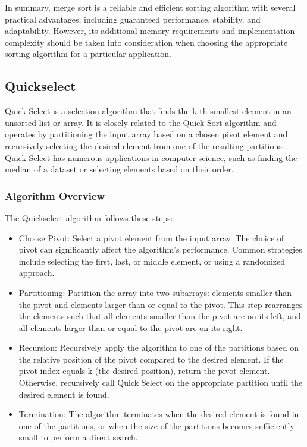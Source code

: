 \documentclass[12pt]{book} %
\begin{document}
In summary, merge sort is a reliable and efficient sorting algorithm with several practical advantages, including guaranteed performance, stability, and adaptability. However, its additional memory requirements and implementation complexity should be taken into consideration when choosing the appropriate sorting algorithm for a particular application.

\subsection{Quickselect}
Quick Select is a selection algorithm that finds the k-th smallest element in an unsorted list or array. It is closely related to the Quick Sort algorithm and operates by partitioning the input array based on a chosen pivot element and recursively selecting the desired element from one of the resulting partitions. Quick Select has numerous applications in computer science, such as finding the median of a dataset or selecting elements based on their order.
\subsubsection{Algorithm Overview}

The Quickselect algorithm follows these steps:
\begin{itemize}
    \item Choose Pivot: Select a pivot element from the input array. The choice of pivot can significantly affect the algorithm's performance. Common strategies include selecting the first, last, or middle element, or using a randomized approach.
    \item Partitioning: Partition the array into two subarrays: elements smaller than the pivot and elements larger than or equal to the pivot. This step rearranges the elements such that all elements smaller than the pivot are on its left, and all elements larger than or equal to the pivot are on its right.
    \item Recursion: Recursively apply the algorithm to one of the partitions based on the relative position of the pivot compared to the desired element. If the pivot index equals k (the desired position), return the pivot element. Otherwise, recursively call Quick Select on the appropriate partition until the desired element is found.
    \item Termination: The algorithm terminates when the desired element is found in one of the partitions, or when the size of the partitions becomes sufficiently small to perform a direct search.
\end{itemize}
\end{document}
